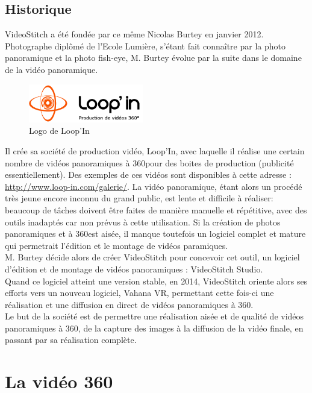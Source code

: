 \subsection{Historique}
VideoStitch a été fondée par ce même Nicolas Burtey en janvier 2012.\\
Photographe diplômé de l'Ecole Lumière, s'étant fait connaître par la photo panoramique 
et la photo fish-eye, M. Burtey évolue par la suite dans le domaine de la vidéo panoramique.\\
\begin{figure}
  \centering
  \includegraphics[width=5cm]{images/loopin.png}
  \caption{Logo de Loop'In}
\end{figure}
Il crée sa société de production vidéo, Loop'In, avec laquelle il réalise une 
certain nombre de vidéos panoramiques à 360\degree pour des boites de production (publicité essentiellement). 
Des exemples de ces vidéos sont disponibles à cette adresse : \url{http://www.loop-in.com/galerie/}.
La vidéo panoramique, étant alors un procédé très jeune encore inconnu du grand public, est 
lente et difficile à réaliser: beaucoup de tâches doivent être faites de manière 
manuelle et répétitive, avec des outils inadaptés car non prévus à cette utilisation.
Si la création de photos panoramiques et à 360\degree est aisée, il manque toutefois 
un logiciel complet et mature qui permetrait l'édition et le montage de vidéos paramiques.\\
\newline
M. Burtey décide alors de créer VideoStitch pour concevoir cet outil, un logiciel 
d'édition et de montage de vidéos panoramiques : VideoStitch Studio.\\
Quand ce logiciel atteint une version stable, en 2014, VideoStitch oriente alors 
ses efforts vers un nouveau logiciel, Vahana VR, permettant cette fois-ci une réalisation 
et une diffusion en direct de vidéos panoramiques à 360\degree.\\
\newline
Le but de la société est de permettre une réalisation aisée et de qualité de vidéos 
panoramiques à 360\degree, de la capture des images à la diffusion de la vidéo finale, 
en passant par sa réalisation complète.


\section{La vidéo 360}
